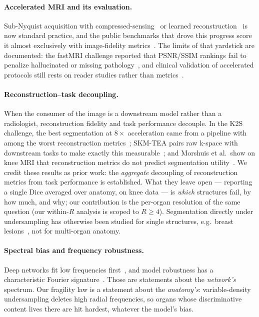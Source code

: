 \documentclass[10pt,twocolumn,letterpaper]{article}
\begin{document}
\paragraph{Accelerated MRI and its evaluation.}
Sub-Nyquist acquisition with compressed-sensing~\cite{lustig2007} or learned reconstruction~\cite{hammernik2018,sriram2020,akcakaya2022,heckel2024} is now standard practice, and the public benchmarks that drove this progress score it almost exclusively with image-fidelity metrics~\cite{zbontar2018fastmri,knoll2020}. The limits of that yardstick are documented: the fastMRI challenge reported that PSNR/SSIM rankings fail to penalize hallucinated or missing pathology~\cite{muckley2021}, and clinical validation of accelerated protocols still rests on reader studies rather than metrics~\cite{radmanesh2022,chaudhari2020}.

\paragraph{Reconstruction--task decoupling.}
When the consumer of the image is a downstream model rather than a radiologist, reconstruction fidelity and task performance decouple. In the K2S challenge, the best segmentation at $8\times$ acceleration came from a pipeline with among the worst reconstruction metrics~\cite{tolpadi2023}; SKM-TEA pairs raw k-space with downstream tasks to make exactly this measurable~\cite{desai2022skmtea}; and Morshuis et al.\ show on knee MRI that reconstruction metrics do not predict segmentation utility~\cite{morshuis2025}. We credit these results as prior work: the \emph{aggregate} decoupling of reconstruction metrics from task performance is established. What they leave open --- reporting a single Dice averaged over anatomy, on knee data --- is \emph{which} structures fail, by how much, and why; our contribution is the per-organ resolution of the same question (our within-$R$ analysis is scoped to $R\ge 4$). Segmentation directly under undersampling has otherwise been studied for single structures, e.g.\ breast lesions~\cite{rotkopf2026}, not for multi-organ anatomy.

\paragraph{Spectral bias and frequency robustness.}
Deep networks fit low frequencies first~\cite{rahaman2019,xu2019}, and model robustness has a characteristic Fourier signature~\cite{yin2019}. Those are statements about the \emph{network's} spectrum. Our fragility law is a statement about the \emph{anatomy's}: variable-density undersampling deletes high radial frequencies, so organs whose discriminative content lives there are hit hardest, whatever the model's bias.
\end{document}
